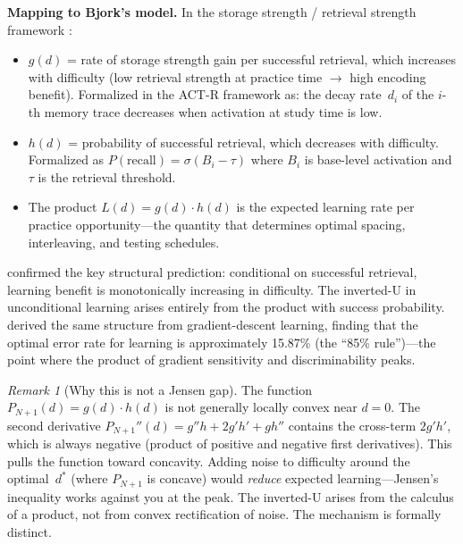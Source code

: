 \documentclass[12pt,letterpaper]{article}
\theoremstyle{definition}
\theoremstyle{remark}
\newtheorem{remark}[theorem]{Remark}
\newcommand{\Pnp}{P_{N+1}}
\begin{document}
\textbf{Mapping to Bjork's model.} In the storage strength / retrieval strength framework \citep{bjork1992,pavlik2005}:
\begin{itemize}
    \item $g(d)$ = rate of storage strength gain per successful retrieval, which increases with difficulty (low retrieval strength at practice time $\to$ high encoding benefit). Formalized in the ACT-R framework as: the decay rate~$d_i$ of the $i$-th memory trace decreases when activation at study time is low.
    \item $h(d)$ = probability of successful retrieval, which decreases with difficulty. Formalized as $P(\text{recall}) = \sigma(B_i - \tau)$ where $B_i$ is base-level activation and $\tau$ is the retrieval threshold.
    \item The product $L(d) = g(d) \cdot h(d)$ is the expected learning rate per practice opportunity---the quantity that determines optimal spacing, interleaving, and testing schedules.
\end{itemize}

\citet{pyc2009} confirmed the key structural prediction: conditional on successful retrieval, learning benefit is monotonically increasing in difficulty. The inverted-U in unconditional learning arises entirely from the product with success probability. \citet{wilson2019} derived the same structure from gradient-descent learning, finding that the optimal error rate for learning is approximately 15.87\% (the ``85\% rule'')---the point where the product of gradient sensitivity and discriminability peaks.

\begin{remark}[Why this is not a Jensen gap]
The function $\Pnp(d) = g(d) \cdot h(d)$ is not generally locally convex near $d = 0$. The second derivative $P_{N+1}''(d) = g''h + 2g'h' + gh''$ contains the cross-term $2g'h'$, which is always negative (product of positive and negative first derivatives). This pulls the function toward concavity. Adding noise to difficulty around the optimal~$d^*$ (where $\Pnp$ is concave) would \emph{reduce} expected learning---Jensen's inequality works against you at the peak. The inverted-U arises from the calculus of a product, not from convex rectification of noise. The mechanism is formally distinct.
\end{remark}
\end{document}
